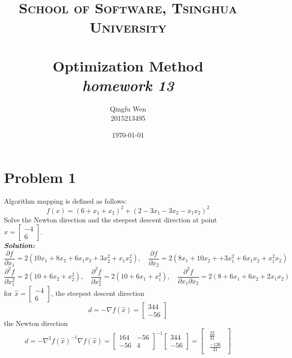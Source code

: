 \documentclass[paper=a4, fontsize=11pt]{scrartcl} %
\title{	
\normalfont \normalsize
\textsc{School of Software, Tsinghua University} \\ [25pt] %
\horrule{0.5pt} \\[0.4cm] %
\huge Optimization Method\\ %
\LARGE\textit{homework 13}
\horrule{2pt} \\[0.5cm] %
}
\author{Qingfu Wen \\ \normalsize 2015213495} %
\date{\normalsize\today} %
\numberwithin{equation}{section} %
\numberwithin{figure}{section} %
\numberwithin{table}{section} %
\begin{document}
\maketitle %
\tableofcontents
\newpage
\section{Problem 1}
Algorithm mapping is defined as follows:
\begin{equation} \nonumber
f(x) = (6+x_1+x_2)^2+(2-3x_1-3x_2-x_1x_2)^2
\end{equation}
Solve the Newton direction and the steepest descent direction at point $\hat{x}=\begin{bmatrix}-4\\6\end{bmatrix}$.
\\
\emph{\textbf{Solution:}}
\begin{equation}\nonumber
\frac{\partial f}{\partial x_1}=2(10x_1+8x_2+6x_1x_2+3x_2^2+x_1x_2^2), \quad
\frac{\partial f}{\partial x_2}=2(8x_1+10x_2++3x_1^2+6x_1x_2+x_1^2x_2) 
\end{equation}
\begin{equation}\nonumber
\frac{\partial^2 f}{\partial x_1^2}=2(10+6x_2+x_2^2),\quad
\frac{\partial^2 f}{\partial x_2^2}=2(10+6x_1+x_1^2),\quad
\frac{\partial^2 f}{\partial x_1\partial x_2}=2(8+6x_1+6x_2+2x_1x_2) 
\end{equation}
for $\hat{x}=\begin{bmatrix}-4\\6\end{bmatrix}$, the steepest descent direction
\begin{equation}\nonumber
d = - \nabla f(\hat{x}) = \begin{bmatrix}344\\-56\end{bmatrix}
\end{equation}
the Newton direction
\begin{equation}\nonumber
d = - \nabla^2 f(\hat{x})^{-1}\nabla f(\hat{x}) =\begin{bmatrix}164&-56\\-56&4\end{bmatrix}^{-1}\begin{bmatrix}344\\-56\end{bmatrix}
=\begin{bmatrix} \begin{smallmatrix}\frac{22}{31}\\\frac{-126}{31} \end{smallmatrix}\end{bmatrix}
\end{equation}
\end{document}

